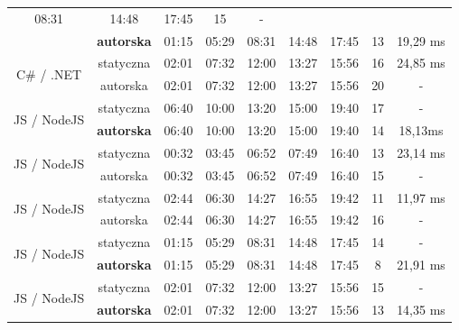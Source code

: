 \begin{table}[htb]
{\begin{tabular}{|c|c|ccccc|c|c|}
  \multicolumn{1}{c|}{08:31} &
  \multicolumn{1}{c|}{14:48} &
  17:45 &
  15 &
  - \\ \cline{2-9} 
 &
  \textbf{autorska} &
  \multicolumn{1}{c|}{01:15} &
  \multicolumn{1}{c|}{05:29} &
  \multicolumn{1}{c|}{08:31} &
  \multicolumn{1}{c|}{14:48} &
  17:45 &
  13 &
  19,29 ms \\ \hline
\multirow{2}{*}{C\# / .NET} &
  statyczna &
  \multicolumn{1}{c|}{02:01} &
  \multicolumn{1}{c|}{07:32} &
  \multicolumn{1}{c|}{12:00} &
  \multicolumn{1}{c|}{13:27} &
  15:56 &
  16 &
  24,85 ms \\ \cline{2-9} 
 &
  autorska &
  \multicolumn{1}{c|}{02:01} &
  \multicolumn{1}{c|}{07:32} &
  \multicolumn{1}{c|}{12:00} &
  \multicolumn{1}{c|}{13:27} &
  15:56 &
  20 &
  - \\ \hline
\multirow{2}{*}{JS / NodeJS} &
  statyczna &
  \multicolumn{1}{c|}{06:40} &
  \multicolumn{1}{c|}{10:00} &
  \multicolumn{1}{c|}{13:20} &
  \multicolumn{1}{c|}{15:00} &
  19:40 &
  17 &
  - \\ \cline{2-9} 
 &
  \textbf{autorska} &
  \multicolumn{1}{c|}{06:40} &
  \multicolumn{1}{c|}{10:00} &
  \multicolumn{1}{c|}{13:20} &
  \multicolumn{1}{c|}{15:00} &
  19:40 &
  14 &
  18,13ms \\ \hline
\multirow{2}{*}{JS / NodeJS} &
  statyczna &
  \multicolumn{1}{c|}{00:32} &
  \multicolumn{1}{c|}{03:45} &
  \multicolumn{1}{c|}{06:52} &
  \multicolumn{1}{c|}{07:49} &
  16:40 &
  13 &
  23,14 ms \\ \cline{2-9} 
 &
  autorska &
  \multicolumn{1}{c|}{00:32} &
  \multicolumn{1}{c|}{03:45} &
  \multicolumn{1}{c|}{06:52} &
  \multicolumn{1}{c|}{07:49} &
  16:40 &
  15 &
  - \\ \hline
\multirow{2}{*}{JS / NodeJS} &
  statyczna &
  \multicolumn{1}{c|}{02:44} &
  \multicolumn{1}{c|}{06:30} &
  \multicolumn{1}{c|}{14:27} &
  \multicolumn{1}{c|}{16:55} &
  19:42 &
  11 &
  11,97 ms \\ \cline{2-9} 
 &
  autorska &
  \multicolumn{1}{c|}{02:44} &
  \multicolumn{1}{c|}{06:30} &
  \multicolumn{1}{c|}{14:27} &
  \multicolumn{1}{c|}{16:55} &
  19:42 &
  16 &
  - \\ \hline
\multirow{2}{*}{JS / NodeJS} &
  statyczna &
  \multicolumn{1}{c|}{01:15} &
  \multicolumn{1}{c|}{05:29} &
  \multicolumn{1}{c|}{08:31} &
  \multicolumn{1}{c|}{14:48} &
  17:45 &
  14 &
  - \\ \cline{2-9} 
 &
  \textbf{autorska} &
  \multicolumn{1}{c|}{01:15} &
  \multicolumn{1}{c|}{05:29} &
  \multicolumn{1}{c|}{08:31} &
  \multicolumn{1}{c|}{14:48} &
  17:45 &
  8 &
  21,91 ms \\ \hline
\multirow{2}{*}{JS / NodeJS} &
  statyczna &
  \multicolumn{1}{c|}{02:01} &
  \multicolumn{1}{c|}{07:32} &
  \multicolumn{1}{c|}{12:00} &
  \multicolumn{1}{c|}{13:27} &
  15:56 &
  15 &
  - \\ \cline{2-9} 
 &
  \textbf{autorska} &
  \multicolumn{1}{c|}{02:01} &
  \multicolumn{1}{c|}{07:32} &
  \multicolumn{1}{c|}{12:00} &
  \multicolumn{1}{c|}{13:27} &
  15:56 &
  13 &
  14,35 ms \\ \hline
\end{tabular}%
}
\end{table}

